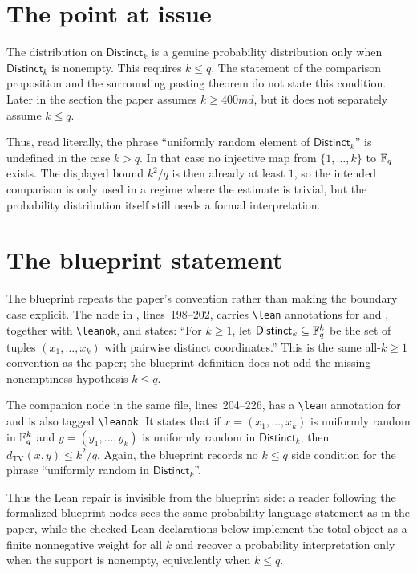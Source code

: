 \documentclass[11pt]{article}
\begin{document}
\section{The point at issue}

The distribution on $\mathsf{Distinct}_k$ is a genuine probability distribution only
when $\mathsf{Distinct}_k$ is nonempty.  This requires $k\le q$.  The statement of the
comparison proposition and the surrounding pasting theorem do not state this
condition.  Later in the section the paper assumes $k\ge 400md$, but it does
not separately assume $k\le q$.

Thus, read literally, the phrase ``uniformly random element of
$\mathsf{Distinct}_k$'' is undefined in the case $k>q$.  In that case no injective map
from $\{1,\ldots,k\}$ to $\mathbb{F}_q$ exists.  The displayed bound $k^2/q$ is then
already at least $1$, so the intended comparison is only used in a regime where
the estimate is trivial, but the probability distribution itself still needs a
formal interpretation.

\section{The blueprint statement}

The blueprint repeats the paper's convention rather than making the boundary
case explicit.  The node  in
, lines~198--202, carries
\verb|\lean| annotations for  and
, together with
\verb|\leanok|, and states: ``For $k\ge 1$, let
$\mathsf{Distinct}_k\subseteq \mathbb{F}_q^k$ be the set of tuples
$(x_1,\dots,x_k)$ with pairwise distinct coordinates.''  This is the same
all-$k\ge 1$ convention as the paper; the blueprint definition does not add the
missing nonemptiness hypothesis $k\le q$.

The companion node  in the same file, lines~204--226, has a
\verb|\lean| annotation for  and is also
tagged \verb|\leanok|.
It states that if $x=(x_1,\dots,x_k)$ is uniformly random in $\mathbb{F}_q^k$ and
$y=(y_1,\dots,y_k)$ is uniformly random in $\mathsf{Distinct}_k$, then
$d_{\mathrm{TV}}(x,y)\le k^2/q$.  Again, the blueprint records no $k\le q$
side condition for the phrase ``uniformly random in $\mathsf{Distinct}_k$''.

Thus the Lean repair is invisible from the blueprint side: a reader following
the formalized blueprint nodes sees the same probability-language statement as
in the paper, while the checked Lean declarations below implement the total
object as a finite nonnegative weight for all $k$ and recover a probability
interpretation only when the support is nonempty, equivalently when $k\le q$.
\end{document}
